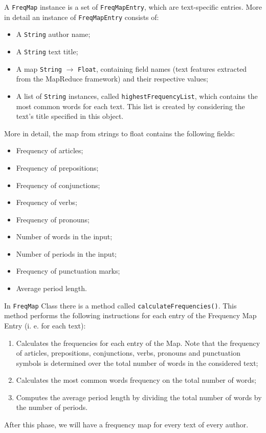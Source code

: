 \documentclass[a4paper,11pt, twoside]{article}
\begin{document}
		\noindent
		A \lstinline|FreqMap| instance is a set of \lstinline|FreqMapEntry|, which are text-specific entries. More in detail an instance of \lstinline|FreqMapEntry| consists of: \begin{itemize}
			\item A \lstinline|String| author name;
			\item A \lstinline|String| text title;
			\item A map \lstinline|String| $\to$ \lstinline|Float|, containing field names (text features extracted from the MapReduce framework) and their respective values;
			\item  A list of \lstinline|String| instances, called \lstinline|highestFrequencyList|, which contains the most common words for each text. This list is created by considering the text's title specified in this object.
		\end{itemize}

		\noindent
		More in detail, the map from strings to float contains the following fields: 
		\begin{multicols}{2}
			\begin{itemize}
				\item Frequency of articles;
				\item Frequency of prepositions;
				\item Frequency of conjunctions;
				\item Frequency of verbs;
				\item Frequency of pronouns;
				\item Number of words in the input;
				\item Number of periods in the input;
				\item Frequency of punctuation marks;
				\item Average period length.
			\end{itemize}
		\end{multicols}

		\noindent
		In \lstinline|FreqMap| Class there is a method called \lstinline|calculateFrequencies()|. This method performs the following instructions for each entry of the Frequency Map Entry (i. e. for each text):
		\begin{enumerate}
			\item Calculates the frequencies for each entry of the Map. Note that the frequency of articles, prepositions, conjunctions, verbs, pronouns and punctuation symbols is determined over the total number of words in the considered text;
			\item Calculates the most common words frequency on the total number of words;
			\item Computes the average period length by dividing the total number of words by the number of periods.
		\end{enumerate}
		After this phase, we will have a frequency map for every text of every author.
\end{document}
